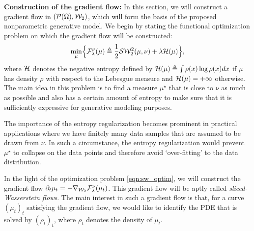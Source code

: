

\vspace{-5pt}

\textbf{Construction of the gradient flow: }
%
In this section, we will construct a gradient flow in $({\cal P}(\Omega),{\cal W}_2)$, which will form the basis of the proposed nonparametric generative model. We begin by stating the functional optimization problem on which the gradient flow will be constructed:
\begin{align}
\min_\mu \Bigl\{ {\cal F}^{\nu}_\lambda(\mu) \triangleq  \frac1{2} {\cal S}{\cal W}_2^2(\mu, \nu) + \lambda {\cal H}(\mu) \Bigr\}, \label{eqn:sw_optim}
\end{align}
where ${\cal H}$ denotes the negative entropy defined by ${\cal H}(\mu) \triangleq \int \rho(x) \log \rho(x) dx $ if $\mu$ has density $\rho$ with respect to the Lebesgue measure and ${\cal H}(\mu) = + \infty$ otherwise. The main idea in this problem is to find a measure $\mu^\star$ that is close to $\nu$ as much as possible and also has a certain amount of entropy to make sure that it is sufficiently expressive for generative modeling purposes.

The importance of the entropy regularization becomes prominent in practical applications where we have finitely many data samples that are assumed to be drawn from $\nu$. In such a circumstance, the entropy regularization would prevent $\mu^\star$ to collapse on the data points and therefore avoid `over-fitting' to the data distribution.


In the light of the optimization problem \eqref{eqn:sw_optim}, we will construct the gradient flow $\partial_t \mu_t = - \nabla_{{\cal W}_2} {\cal F}^{\nu}_\lambda(\mu_t)$. This gradient flow will be aptly called \emph{sliced-Wasserstein flows}. The main interest in such a gradient flow is that, for a curve $(\mu_t)_t$ satisfying the gradient flow, we would like to identify the PDE that is solved by $(\rho_t)_t$, where $\rho_t$ denotes the density of $\mu_t$.

